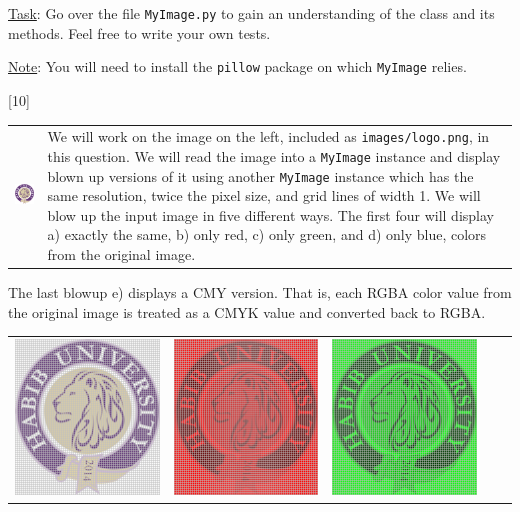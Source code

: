\documentclass[addpoints]{exam}
\begin{document}
\begin{questions}
  \underline{Task}: Go over the file \texttt{MyImage.py} to gain an understanding of the class and its methods. Feel free to write your own tests.

  \underline{Note}: You will need to install the \texttt{pillow} package on which \texttt{MyImage} relies.

[10]

  \begin{tabularx}{\textwidth}{cX}
    \includegraphics[align=t]{logo} & We will work on the image on the left, included as \texttt{images/logo.png}, in this question. We will read the image into a \texttt{MyImage} instance and display blown up versions of it using another \texttt{MyImage} instance which has the same resolution, twice the pixel size, and grid lines of width 1. We will blow up the input image in five different ways. The first four will display a) exactly the same, b) only red, c) only green, and d) only blue, colors from the original image.
  \end{tabularx}
  The last blowup e) displays a CMY version. That is, each RGBA color value from the original image is treated as a CMYK value and converted back to RGBA.
  \begin{center}
    \begin{tabular}{*{5}{c}}
      \includegraphics[width=.16\textwidth]{blow}
      & \includegraphics[width=.16\textwidth]{logo-r}
      & \includegraphics[width=.16\textwidth]{logo-g}

\end{tabular}
\end{center}
\end{questions}
\end{document}
